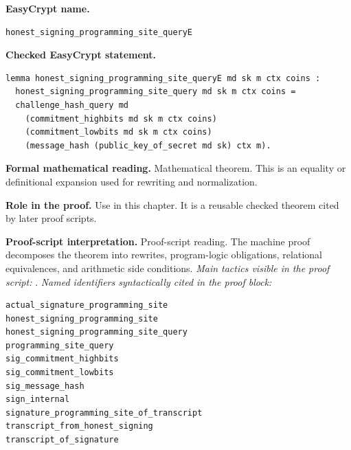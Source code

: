 \begin{formaltheorem}
\noindent\textbf{EasyCrypt name.}
\begin{lstlisting}[language=EasyCrypt,basicstyle=\ttfamily\scriptsize]
honest_signing_programming_site_queryE
\end{lstlisting}
\noindent\textbf{Checked EasyCrypt statement.}
\begin{lstlisting}[language=EasyCrypt,basicstyle=\ttfamily\scriptsize]
lemma honest_signing_programming_site_queryE md sk m ctx coins :
  honest_signing_programming_site_query md sk m ctx coins =
  challenge_hash_query md
    (commitment_highbits md sk m ctx coins)
    (commitment_lowbits md sk m ctx coins)
    (message_hash (public_key_of_secret md sk) ctx m).
\end{lstlisting}
\noindent\textbf{Formal mathematical reading.}
Mathematical theorem. This is an equality or definitional expansion used for rewriting and normalization.

\noindent\textbf{Role in the proof.}
Use in this chapter. It is a reusable checked theorem cited by later proof scripts.

\noindent\textbf{Proof-script interpretation.}
Proof-script reading. The machine proof decomposes the theorem into rewrites, program-logic obligations, relational equivalences, and arithmetic side conditions.
\emph{Main tactics visible in the proof script:} .
\emph{Named identifiers syntactically cited in the proof block:}
\begin{lstlisting}[language=EasyCrypt,basicstyle=\ttfamily\scriptsize]
actual_signature_programming_site
honest_signing_programming_site
honest_signing_programming_site_query
programming_site_query
sig_commitment_highbits
sig_commitment_lowbits
sig_message_hash
sign_internal
signature_programming_site_of_transcript
transcript_from_honest_signing
transcript_of_signature
\end{lstlisting}

\end{formaltheorem}

